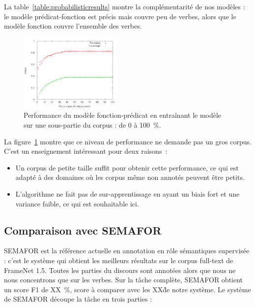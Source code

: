 La table~\ref{table:probabilisticresults} montre la complémentarité de nos
modèles : le modèle prédicat-fonction est précis mais couvre peu de verbes, alors
que le modèle fonction couvre l'ensemble des verbes.

\begin{figure}[t]
    \centering
    \includegraphics[width=0.45\textwidth]{fig/slot-predicate-percents.png}
    \caption{\label{fig:fonction_predicate}Performance du modèle fonction-prédicat en entraînant le modèle sur une sous-partie du corpus : de 0 à 100~\%.}
\end{figure}

La figure~\ref{fig:fonction_predicate} montre que ce niveau de performance ne
demande pas un gros corpus. C'est un enseignement intéressant pour deux
raisons~:

\begin{itemize}

    \item Un corpus de petite taille suffit pour obtenir cette performance, ce
    qui est adapté à des domaines où les corpus même non annotés peuvent être
    petits.

    \item L'algorithme ne fait pas de sur-apprentissage en ayant un biais fort
    et une variance faible, ce qui est souhaitable ici.

\end{itemize}

\subsection{Comparaison avec SEMAFOR}

SEMAFOR \citep{das2014frame} est la référence actuelle en annotation en rôle
sémantiques supervisée : c'est le système qui obtient les meilleurs résultats
sur le corpus full-text de FrameNet 1.5. Toutes les parties du discours sont
annotées alors que nous ne nous concentrons que sur les verbes. Sur la tâche
complète, SEMAFOR obtient un score F1 de XX~\%, score à comparer avec les XX\~
de notre système. Le système de SEMAFOR découpe la tâche en trois parties :

